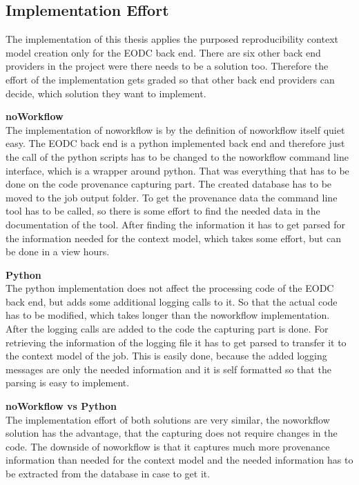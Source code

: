 \documentclass[draft,final]{vutinfth} %
\begin{document}
\subsection{Implementation Effort}\label{NvsP:Implementation Effort}
The implementation of this thesis applies the purposed reproducibility context model creation only for the EODC back end. There are six other back end providers in the project were there needs to be a solution too. Therefore the effort of the implementation gets graded so that other back end providers can decide, which solution they want to implement.

\textbf{noWorkflow} \\
The implementation of noworkflow is by the definition of noworkflow itself quiet easy. The EODC back end is a python implemented back end and therefore just the call of the python scripts has to be changed to the noworkflow command line interface, which is a wrapper around python. That was everything that has to be done on the code provenance capturing part. The created database has to be moved to the job output folder. To get the provenance data the command line tool has to be called, so there is some effort to find the needed data in the documentation of the tool. After finding the information it has to get parsed for the information needed for the context model, which takes some effort, but can be done in a view hours. 

\textbf{Python} \\
The python implementation does not affect the processing code of the EODC back end, but adds some additional logging calls to it. So that the actual code has to be modified, which takes longer than the noworkflow implementation. After the logging calls are added to the code the capturing part is done. For retrieving the information of the logging file it has to get parsed to transfer it to the context model of the job. This is easily done, because the added logging messages are only the needed information and it is self formatted so that the parsing is easy to implement.   

\textbf{noWorkflow vs Python} \\
The implementation effort of both solutions are very similar, the noworkflow solution has the advantage, that the capturing does not require changes in the code. The downside of noworkflow is that it captures much more provenance information than needed for the context model and the needed information has to be extracted from the database in case to get it. 
\end{document}
